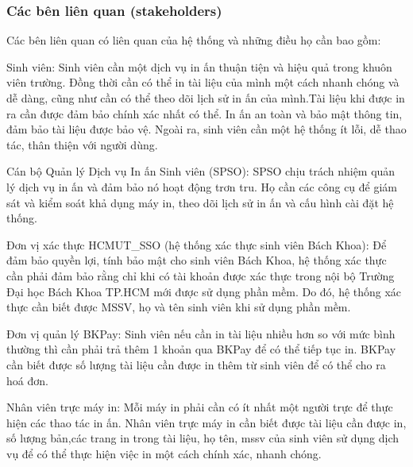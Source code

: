 \documentclass[a4paper]{article}
\theoremstyle{definition}
\begin{document}
\subsubsection{Các bên liên quan (stakeholders)}
Các bên liên quan có liên quan của hệ thống và những điều họ cần bao gồm:\par
 Sinh viên: Sinh viên cần một dịch vụ in ấn thuận tiện và hiệu quả trong khuôn viên trường. Đồng thời cần có thể in tài liệu của mình một cách nhanh chóng và dễ dàng, cũng như cần có thể theo dõi lịch sử in ấn của mình.Tài liệu khi được in ra cần được đảm bảo chính xác nhất có thể. In ấn an toàn và bảo mật thông tin, đảm bảo tài liệu được bảo vệ. Ngoài ra, sinh viên cần một hệ thống ít lỗi, dễ thao tác, thân thiện với người dùng. \par
 Cán bộ Quản lý Dịch vụ In ấn Sinh viên (SPSO): SPSO chịu trách nhiệm quản lý dịch vụ in ấn và đảm bảo nó hoạt động trơn tru. Họ cần các công cụ để giám sát và kiểm soát khả dụng máy in, theo dõi lịch sử in ấn và cấu hình cài đặt hệ thống.\par
Đơn vị xác thực HCMUT\_SSO (hệ thống xác thực sinh viên Bách Khoa): Để đảm bảo quyền lợi, tính bảo mật cho sinh viên Bách Khoa, hệ thống xác thực cần phải đảm bảo rằng chỉ khi có tài khoản được xác thực trong nội bộ Trường Đại học Bách Khoa TP.HCM mới được sử dụng phần mềm. Do đó, hệ thống xác thực cần biết được MSSV, họ và tên sinh viên khi sử dụng phần mềm. \par
Đơn vị quản lý BKPay: Sinh viên nếu cần in tài liệu nhiều hơn so với mức bình thường thì cần phải trả thêm 1 khoản qua BKPay để có thể tiếp tục in. BKPay cần biết được số lượng tài liệu cần được in thêm từ sinh viên để có thể cho ra hoá đơn.\par
Nhân viên trực máy in: Mỗi máy in phải cần có ít nhất một người trực để thực hiện các thao tác in ấn. Nhân viên trực máy in cần biết được tài liệu cần được in, số lượng bản,các trang in trong tài liệu, họ tên, mssv của sinh viên sử dụng dịch vụ để có thể thực hiện việc in một cách chính xác, nhanh chóng.
\end{document}
